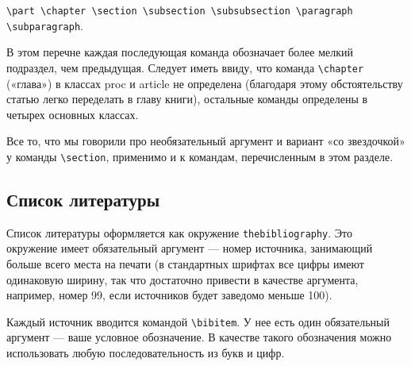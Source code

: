\documentclass[a4paper,11pt]{article} %
\begin{document}
\verb"\part \chapter \section \subsection \subsubsection \paragraph \subparagraph".

В этом перечне каждая последующая команда обозначает более мелкий подраздел, чем предыдущая. Следует иметь ввиду, что команда \verb"\chapter" («глава») в классах proc и article не определена (благодаря этому обстоятельству статью легко переделать в главу книги), остальные команды определены в четырех основных классах.

Все то, что мы говорили про необязательный аргумент и вариант
«со звездочкой» у команды \verb"\section", применимо и к командам, перечисленным в этом разделе.


\subsection{Список литературы}

Список литературы оформляется как окружение \verb"thebibliography".
Это окружение имеет обязательный аргумент --- номер источника, занимающий больше всего места на печати (в стандартных шрифтах все цифры имеют одинаковую ширину, так что достаточно привести в качестве аргумента, например, номер 99, если источников будет заведомо меньше 100).

Каждый источник вводится командой \verb"\bibitem". У нее есть один обязательный аргумент --- ваше условное обозначение. В качестве такого
обозначения можно использовать любую последовательность из букв и
цифр.
\end{document}
